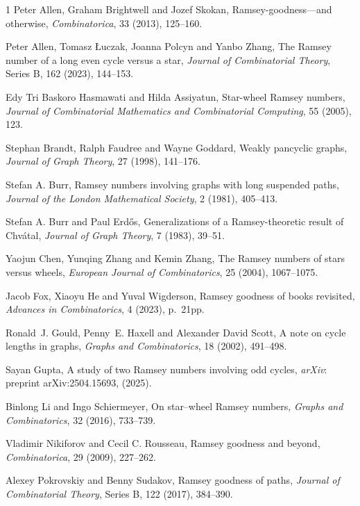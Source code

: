 \documentclass[reqno,10pt]{amsart}
\theoremstyle{definition}
\begin{document}
  

\begin{thebibliography}{1}
{\sc  Peter Allen, Graham  Brightwell and Jozef  Skokan}, Ramsey-goodness—and otherwise, \emph{Combinatorica}, 33 (2013), 125--160.

{\sc Peter Allen, Tomasz \L uczak, Joanna Polcyn and Yanbo Zhang}, The Ramsey number of a long even cycle versus a star, \emph{Journal of Combinatorial Theory}, Series B, 162 (2023), 144--153.

{\sc Edy Tri  Baskoro Hasmawati and Hilda Assiyatun}, Star-wheel Ramsey numbers, \emph{Journal of Combinatorial Mathematics and Combinatorial Computing}, 55 (2005), 123.

{\sc Stephan  Brandt, Ralph Faudree and  Wayne Goddard}, Weakly pancyclic graphs, \emph{Journal of Graph Theory}, 27 (1998), 141--176.

{\sc Stefan A. Burr}, Ramsey numbers involving graphs with long suspended paths, \emph{Journal of the London Mathematical Society}, 2 (1981), 405--413.

{\sc Stefan A. Burr and Paul Erd\H os}, Generalizations of a Ramsey-theoretic result of Chv{\'a}tal, \emph{Journal of Graph Theory}, 7 (1983), 39--51.

{\sc Yaojun Chen,  Yunqing Zhang and Kemin Zhang}, The Ramsey numbers of stars versus wheels, \emph{European Journal of Combinatorics}, 25 (2004), 1067--1075.

{\sc Jacob Fox, Xiaoyu He and Yuval  Wigderson}, Ramsey goodness of books revisited, \emph{Advances in Combinatorics}, 4 (2023), p.~21pp.

{\sc Ronald~J. Gould, Penny~E. Haxell and Alexander David Scott}, A note on cycle lengths in graphs, \emph{Graphs and Combinatorics}, 18 (2002), 491--498.

{\sc Sayan Gupta}, A study of two Ramsey numbers involving odd cycles, \emph{arXiv}: preprint arXiv:2504.15693,  (2025).

{\sc Binlong Li and Ingo Schiermeyer}, On star--wheel Ramsey numbers, \emph{Graphs and Combinatorics}, 32 (2016), 733--739.

{\sc Vladimir Nikiforov and Cecil C. Rousseau}, Ramsey goodness and beyond, \emph{Combinatorica}, 29 (2009), 227--262.

{\sc Alexey Pokrovskiy and Benny Sudakov}, Ramsey goodness of paths, \emph{Journal of Combinatorial Theory}, Series B, 122 (2017), 384--390.


\end{thebibliography}
\end{document}
